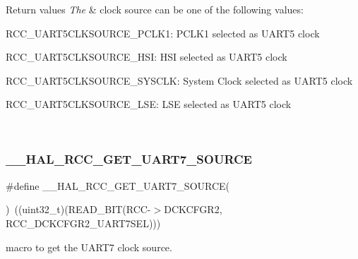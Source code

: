 \begin{DoxyRetVals}{Return values}
{\em The} & clock source can be one of the following values\+: \begin{DoxyItemize}
\item R\+C\+C\+\_\+\+U\+A\+R\+T5\+C\+L\+K\+S\+O\+U\+R\+C\+E\+\_\+\+P\+C\+L\+K1\+: P\+C\+L\+K1 selected as U\+A\+R\+T5 clock \item R\+C\+C\+\_\+\+U\+A\+R\+T5\+C\+L\+K\+S\+O\+U\+R\+C\+E\+\_\+\+H\+SI\+: H\+SI selected as U\+A\+R\+T5 clock \item R\+C\+C\+\_\+\+U\+A\+R\+T5\+C\+L\+K\+S\+O\+U\+R\+C\+E\+\_\+\+S\+Y\+S\+C\+LK\+: System Clock selected as U\+A\+R\+T5 clock \item R\+C\+C\+\_\+\+U\+A\+R\+T5\+C\+L\+K\+S\+O\+U\+R\+C\+E\+\_\+\+L\+SE\+: L\+SE selected as U\+A\+R\+T5 clock \end{DoxyItemize}
\\
\hline
\end{DoxyRetVals}
\mbox{\label{group___r_c_c_ex___exported___macros_ga50e3e434918cccde0b2a78df2c25ffed}} 
\subsubsection{\texorpdfstring{\_\_HAL\_RCC\_GET\_UART7\_SOURCE}{\_\_HAL\_RCC\_GET\_UART7\_SOURCE}}
{\footnotesize\ttfamily \#define \+\_\+\+\_\+\+H\+A\+L\+\_\+\+R\+C\+C\+\_\+\+G\+E\+T\+\_\+\+U\+A\+R\+T7\+\_\+\+S\+O\+U\+R\+CE(\begin{DoxyParamCaption}{ }\end{DoxyParamCaption})~((uint32\+\_\+t)(R\+E\+A\+D\+\_\+\+B\+IT(R\+CC-\/$>$D\+C\+K\+C\+F\+G\+R2, R\+C\+C\+\_\+\+D\+C\+K\+C\+F\+G\+R2\+\_\+\+U\+A\+R\+T7\+S\+EL)))}



macro to get the U\+A\+R\+T7 clock source. 


